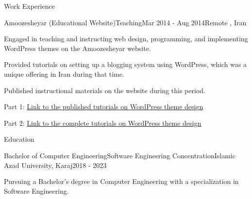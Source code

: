\documentclass[]{kyvernitis-resume}
\begin{document}
\begin{section}{Work Experience}
 \begin{subsection}{Amoozesheyar (Educational Website)}{Teaching}{Mar 2014 - Aug 2014}{Remote , Iran}
	\item Engaged in teaching and instructing web design, programming, and implementing WordPress themes on the Amoozesheyar website.
	\item Provided tutorials on setting up a blogging system using WordPress, which was a unique offering in Iran during that time.
	\item Published instructional materials on the website during this period.
	\item Part 1:  \href{https://www.daneshjooyar.com/%d9%82%d8%b3%d9%85%d8%aa-%d9%86%d9%87%d8%a7%db%8c%db%8c-%d8%b3%d8%b1%db%8c-%d8%a2%d9%85%d9%88%d8%b2%d8%b4%db%8c-%d8%b7%d8%b1%d8%a7%d8%ad%db%8c-%d9%82%d8%a7%d9%84%d8%a8-%d9%88%d8%b1%d8%af%d9%be%d8%b1/}{Link to the published tutorials on WordPress theme design} 
	\item Part 2: \href{https://www.daneshjooyar.com/%d8%a2%d9%85%d9%88%d8%b2%d8%b4-%d8%b7%d8%b1%d8%a7%d8%ad%db%8c-%d9%82%d8%a7%d9%84%d8%a8-%d9%88%d8%b1%d8%af%d9%be%d8%b1%d8%b3-%d8%aa%d9%85%d8%a7%d9%85%db%8c-%d9%82%d8%b3%d9%85%d8%aa-%d9%87%d8%a7-%d9%82/}{Link to the complete tutorials on WordPress theme design}
    \end{subsection}
    
\end{section}

\begin{section}{Education}

\begin{subsectionnobullet}{Bachelor of Computer Engineering}{Software Engineering Concentration}{Islamic Azad University, Karaj}{2018 - 2023}
\item Pursuing a Bachelor's degree in Computer Engineering with a specialization in Software Engineering.
\end{subsectionnobullet}

\end{section}
\end{document}
